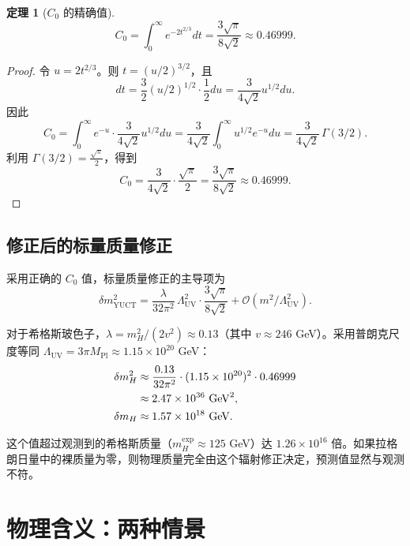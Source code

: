 \documentclass[11pt,a4paper]{article}
\newcommand{\Mpl}{M_{\mathrm{Pl}}}
\newcommand{\LUV}{\Lambda_{\mathrm{UV}}}
\newtheorem{theorem}{定理}[section]
\theoremstyle{remark}
\begin{document}
	\begin{theorem}[\(C_0\) 的精确值]
		\label{thm:C0}
		\[
		C_0 = \int_0^{\infty} e^{-2t^{2/3}} dt = \frac{3\sqrt{\pi}}{8\sqrt{2}} \approx 0.46999.
		\]
	\end{theorem}
	
	\begin{proof}
		令 \(u = 2t^{2/3}\)。则 \(t = (u/2)^{3/2}\)，且
		\[
		dt = \frac{3}{2} (u/2)^{1/2} \cdot \frac{1}{2} du = \frac{3}{4\sqrt{2}} u^{1/2} du.
		\]
		因此
		\[
		C_0 = \int_0^{\infty} e^{-u} \cdot \frac{3}{4\sqrt{2}} u^{1/2} du = \frac{3}{4\sqrt{2}} \int_0^{\infty} u^{1/2} e^{-u} du = \frac{3}{4\sqrt{2}} \, \Gamma(3/2).
		\]
		利用 \(\Gamma(3/2) = \frac{\sqrt{\pi}}{2}\)，得到
		\[
		C_0 = \frac{3}{4\sqrt{2}} \cdot \frac{\sqrt{\pi}}{2} = \frac{3\sqrt{\pi}}{8\sqrt{2}} \approx 0.46999.
		\]
	\end{proof}
	
	\subsection{修正后的标量质量修正}
	
	采用正确的 \(C_0\) 值，标量质量修正的主导项为
	\begin{equation}
		\boxed{\delta m^2_{\mathrm{YUCT}} = \frac{\lambda}{32\pi^2}\,\LUV^2 \cdot \frac{3\sqrt{\pi}}{8\sqrt{2}} + \mathcal{O}(m^2/\LUV^2)}.
		\label{eq:scalar_corrected}
	\end{equation}
	
	对于希格斯玻色子，\(\lambda = m_H^2/(2v^2) \approx 0.13\)（其中 \(v \approx 246\) GeV）。采用普朗克尺度等同 \(\LUV = 3\pi\Mpl \approx 1.15\times 10^{20}\) GeV：
	\begin{align}
		\delta m^2_H &\approx \frac{0.13}{32\pi^2} \cdot (1.15\times 10^{20})^2 \cdot 0.46999 \notag\\
		&\approx 2.47 \times 10^{36}\ \mathrm{GeV}^2, \notag\\
		\delta m_H &\approx 1.57 \times 10^{18}\ \mathrm{GeV}.
		\label{eq:planck_correction}
	\end{align}
	
	这个值超过观测到的希格斯质量（\(m_H^{\mathrm{exp}} \approx 125\) GeV）达 \(1.26 \times 10^{16}\) 倍。如果拉格朗日量中的裸质量为零，则物理质量完全由这个辐射修正决定，预测值显然与观测不符。
	
	\section{物理含义：两种情景}
	\label{sec:scenarios}
	
\end{document}

